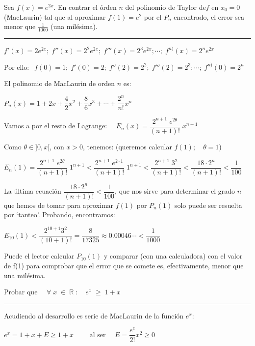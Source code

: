\vspace{5mm}
\begin{miejercicio}
	
  Sea $f(x)=e^{2x}$. En contrar el órden $n$ del polinomio de Taylor de$f$ en $x_0=0$ (MacLaurin) tal que al aproximar $f(1)=e^2$ por el $P_n$ encontrado, el error sea menor que $\frac 1 {1000}$ (una milésima).
		
\rule{200pt}{0.1pt}	
		
		$f'(x)=2e^{2x}; \; f''(x)=2^2 e^{2x}; \; f'''(x)=2^3 e^{2x}; \cdots ; \; f^{n)}(x)=2^n e^{2x}$
		
		Por ello:
		$\ \ f(0)=1; \; f'(0)=2; \; f''(2)=2^2; \; f'''(2)=2^3; \cdots ; \; f^{n)}(0)=2^n$
		
		El polinomio de MacLaurin de orden $n$ es:
		
		$P_n(x)=1+ 2x+\dfrac{4}{2}x^2+\dfrac{8}{6}x^3+ \cdots + \dfrac{2^n}{n!}x^n$
		
		Vamos a por el resto de Lagrange:
		$ \quad E_n(x)=\dfrac{2^{n+1}\; e^{2\theta}}{(n+1)!}\; x^{n+1}$
		
		\vspace{2mm} Como $\theta\in]0,x[$, con $x>0$, tenemos: (queremos calcular $f(1); \quad \theta=1$)
		
		
		\vspace{2mm} $E_n(1)=\dfrac{2^{n+1}\; e^{2 \theta}}{(n+1)!}\; 1^{n+1} < 
		\dfrac{2^{n+1}\; e^{2\cdot 1}}{(n+1)!}\; 1^{n+1} <
		 \dfrac{2^{n+1}\; 3^{2}}{(n+1)!} < \dfrac {18\cdot 2^n}{(n+1)!} < \dfrac {1}{100}  $
		
		
		\vspace{2mm} La última ecuación $\dfrac {18\cdot 2^n}{(n+1)!} < \dfrac {1}{100}  $, que nos sirve para determinar el grado $n$ que hemos de tomar para aproximar $f(1)$ por $P_n(1)$ solo puede ser resuelta por `tanteo'. Probando, encontramos:
		
		\vspace{2mm} $E_{10}(1)<\dfrac {2^{10+1}3^2}{(10+1)!}=\dfrac {8}{17325}\approx 0.00046\cdots < \dfrac {1}{1000}$
		
		\vspace{2mm} Puede el lector calcular $P_{10}(1)$ y comparar (con una calculadora) con el valor de f(1) para comprobar que el error que se comete es, efectivamente, menor que una milésima.
\end{miejercicio}

\vspace{5mm}
\begin{miejercicio}
	
Probar que $\quad \forall \; x \; \in \; \mathbb{R}\; : \quad e^x \; \ge \; 1 + x$

\rule{200pt}{0.1pt}	

Acudiendo al desarrollo es serie de MacLaurin de la función $e^x$:
		
\vspace{2mm} $e^x=1+x+E\ge 1+x \qquad \mbox{ al ser } \quad E=\dfrac {e^c}{2!}x^2\ge 0$
\end{miejercicio}

